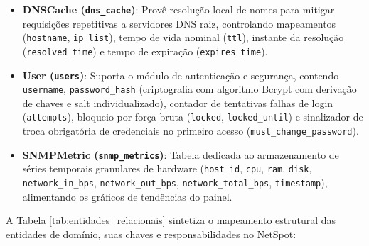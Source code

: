 \documentclass[12pt,a4paper]{article}
\begin{document}
\begin{itemize}[leftmargin=1.25cm]
\item \textbf{DNSCache (\texttt{dns\_cache})}: Provê resolução local de nomes para mitigar requisições repetitivas a servidores DNS raiz, controlando mapeamentos (\texttt{hostname}, \texttt{ip\_list}), tempo de vida nominal (\texttt{ttl}), instante da resolução (\texttt{resolved\_time}) e tempo de expiração (\texttt{expires\_time}).
\item \textbf{User (\texttt{users})}: Suporta o módulo de autenticação e segurança, contendo \texttt{username}, \texttt{password\_hash} (criptografia com algoritmo Bcrypt \cite{provos1999bcrypt} com derivação de chaves e salt individualizado), contador de tentativas falhas de login (\texttt{attempts}), bloqueio por força bruta (\texttt{locked}, \texttt{locked\_until}) e sinalizador de troca obrigatória de credenciais no primeiro acesso (\texttt{must\_change\_password}).
\item \textbf{SNMPMetric (\texttt{snmp\_metrics})}: Tabela dedicada ao armazenamento de séries temporais granulares de hardware (\texttt{host\_id}, \texttt{cpu}, \texttt{ram}, \texttt{disk}, \texttt{network\_in\_bps}, \texttt{network\_out\_bps}, \texttt{network\_total\_bps}, \texttt{timestamp}), alimentando os gráficos de tendências do painel.
\end{itemize}

A Tabela \ref{tab:entidades_relacionais} sintetiza o mapeamento estrutural das entidades de domínio, suas chaves e responsabilidades no NetSpot:
\end{document}

